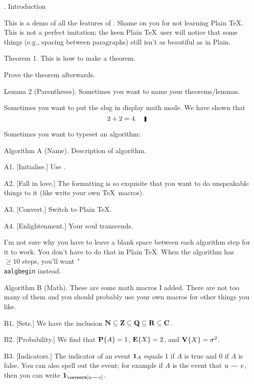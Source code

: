 \documentclass[10pt]{article}
\begin{document}

. Introduction

This is a demo of all the features of \GohLaTeX. Shame on you for not learning Plain \TeX. This
is not a perfect imitation; the keen Plain \TeX\ user will notice that some things (e.g., spacing
between paragraphs) still isn't as beautiful as in Plain.

\proclaim Theorem 1. This is how to make a theorem.

\proof Prove the theorem afterwards.\slug

\parenproclaim Lemma 2 (Parentheses). Sometimes you want to name your theorems/lemmas.

\solution Sometimes you want to put the slug in display math mode. We have shown that
$$2+2 = 4.\noskipslug$$

Sometimes you want to typeset an algorithm:

\algbegin Algorithm A (Name). Description of algorithm.

\algstep A1. [Initialise.] Use \GohLaTeX.

\algstep A2. [Fall in love.] The formatting is so exquisite that you want to do unspeakable things to it (like
write your own \TeX\ macros).

\algstep A3. [Convert.] Switch to Plain \TeX.

\algstep A4. [Enlightenment.] Your soul transcends.\slug

I'm not sure why you have to leave a blank space between each algorithm step for it to work. You don't have
to do that in Plain \TeX. When the algorithm has $\geq 10$ steps, you'll want {\tt \char`\\aalgbegin} instead.

\aalgbegin Algorithm B (Math). These are some math macros I added. There are not too many of them and you
should probably use your own macros for other things you like.

\algstep B1. [Sets.] We have the inclusion ${\bf N}\subseteq {\bf Z} \subseteq {\bf Q}\subseteq  {\bf R}\subseteq  {\bf C}$.

\algstep B2. [Probability.] We find that $\mathop{\hbox{\bf P}}\nolimits\{A\} = 1$, $\mathop{\hbox{\bf E}}\nolimits\{X\} = 2$, and $\mathop{\hbox{\bf V}}\nolimits\{X\} = \sigma^2$.

\algstep B3. [Indicators.] The indicator of an event $\mathop{\hbox{\bf 1}}\nolimits_A$ equals 1 if $A$ is true and 0 if $A$ is false.
You can also spell out the event; for example if $A$ is the event that $u\mathrel-\!\!\mathrel- v$, then you can
write $\indic{u\edge v}$.
\end{document}
